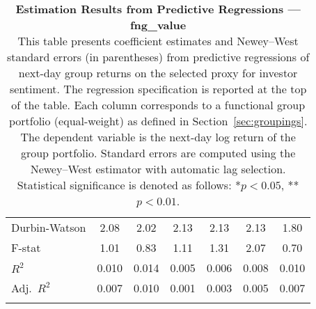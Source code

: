 \begin{table}[ht]
\begin{tabular}{l *{6}{c}}
Durbin-Watson & 2.08 & 2.02 & 2.13 & 2.13 & 2.13 & 1.80 \\
F-stat & 1.01 & 0.83 & 1.11 & 1.31 & 2.07 & 0.70 \\
\(R^2\) & 0.010 & 0.014 & 0.005 & 0.006 & 0.008 & 0.010 \\
Adj.\ \(R^2\) & 0.007 & 0.010 & 0.001 & 0.003 & 0.005 & 0.007 \\
\addlinespace
\midrule
\multicolumn{7}{c}{Specification tested: $R_{g,t+1} = \alpha_g + \beta_{sent,g} S_t + \phi R_{g,t} + \theta B_{g,t} + \gamma M_t + \varepsilon_{g,t+1}$}\\
\bottomrule
\end{tabular}
\caption{\textbf{Estimation Results from Predictive Regressions — fng_value} \\
This table presents coefficient estimates and Newey--West standard errors (in parentheses) from predictive regressions of next-day group returns on the selected proxy for investor sentiment.
The regression specification is reported at the top of the table. Each column corresponds to a functional group portfolio (equal-weight) as defined in Section~\ref{sec:groupings}.
The dependent variable is the next-day log return of the group portfolio. Standard errors are computed using the Newey--West estimator with automatic lag selection. Statistical significance is denoted as follows: *$p<0.05$, **$p<0.01$.}
\label{tab:h2_fng_value_results}
\end{table}
